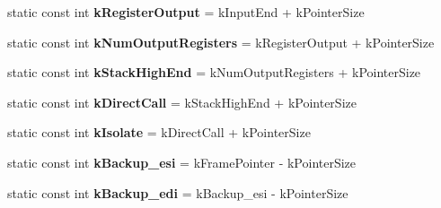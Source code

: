 \begin{DoxyCompactItemize}
\item 
static const int {\bfseries k\+Register\+Output} = k\+Input\+End + k\+Pointer\+Size\hypertarget{classv8_1_1internal_1_1_reg_exp_macro_assembler_i_a32_a57a6340170bbcc4a693f049ecabcbd1e}{}\label{classv8_1_1internal_1_1_reg_exp_macro_assembler_i_a32_a57a6340170bbcc4a693f049ecabcbd1e}

\item 
static const int {\bfseries k\+Num\+Output\+Registers} = k\+Register\+Output + k\+Pointer\+Size\hypertarget{classv8_1_1internal_1_1_reg_exp_macro_assembler_i_a32_aed704042bb230012a39a2d1b939e39de}{}\label{classv8_1_1internal_1_1_reg_exp_macro_assembler_i_a32_aed704042bb230012a39a2d1b939e39de}

\item 
static const int {\bfseries k\+Stack\+High\+End} = k\+Num\+Output\+Registers + k\+Pointer\+Size\hypertarget{classv8_1_1internal_1_1_reg_exp_macro_assembler_i_a32_a4b1d03c052e441dd1db8cd7ed04a20c0}{}\label{classv8_1_1internal_1_1_reg_exp_macro_assembler_i_a32_a4b1d03c052e441dd1db8cd7ed04a20c0}

\item 
static const int {\bfseries k\+Direct\+Call} = k\+Stack\+High\+End + k\+Pointer\+Size\hypertarget{classv8_1_1internal_1_1_reg_exp_macro_assembler_i_a32_a08814c715e8004e51e9130ca9f0aeb5f}{}\label{classv8_1_1internal_1_1_reg_exp_macro_assembler_i_a32_a08814c715e8004e51e9130ca9f0aeb5f}

\item 
static const int {\bfseries k\+Isolate} = k\+Direct\+Call + k\+Pointer\+Size\hypertarget{classv8_1_1internal_1_1_reg_exp_macro_assembler_i_a32_ae384412698ebe6d1221512c1c44e7ef3}{}\label{classv8_1_1internal_1_1_reg_exp_macro_assembler_i_a32_ae384412698ebe6d1221512c1c44e7ef3}

\item 
static const int {\bfseries k\+Backup\+\_\+esi} = k\+Frame\+Pointer -\/ k\+Pointer\+Size\hypertarget{classv8_1_1internal_1_1_reg_exp_macro_assembler_i_a32_a9e3f86e440a6d630e5274ad272b81ce9}{}\label{classv8_1_1internal_1_1_reg_exp_macro_assembler_i_a32_a9e3f86e440a6d630e5274ad272b81ce9}

\item 
static const int {\bfseries k\+Backup\+\_\+edi} = k\+Backup\+\_\+esi -\/ k\+Pointer\+Size\hypertarget{classv8_1_1internal_1_1_reg_exp_macro_assembler_i_a32_a04590c72abe9911f10d85de5b0ae590c}{}\label{classv8_1_1internal_1_1_reg_exp_macro_assembler_i_a32_a04590c72abe9911f10d85de5b0ae590c}


\end{DoxyCompactItemize}

